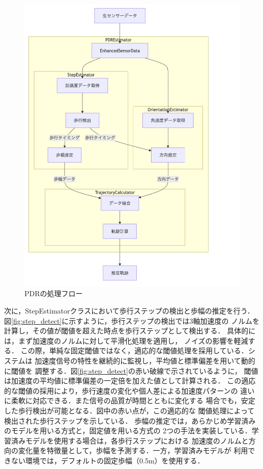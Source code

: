 \begin{figure}[H]
    \centering
    \includegraphics[width=\linewidth]{../image/pdr_flow2.png}
    \caption{PDRの処理フロー}
    \label{fig:pdr-flow}
\end{figure}


次に，StepEstimatorクラスにおいて歩行ステップの検出と歩幅の推定を行う．
図\ref{fig:step_detect}に示すように，歩行ステップの検出では3軸加速度の
ノルムを計算し，その値が閾値を超えた時点を歩行ステップとして検出する．
具体的には，まず加速度のノルムに対して平滑化処理を適用し，
ノイズの影響を軽減する．
この際，単純な固定閾値ではなく，適応的な閾値処理を採用している．システムは
加速度信号の特性を継続的に監視し，平均値と標準偏差を用いて動的に閾値を
調整する．図\ref{fig:step_detect}の赤い破線で示されているように，
閾値は加速度の平均値に標準偏差の一定倍を加えた値として計算される．
この適応的な閾値の採用により，歩行速度の変化や個人差による加速度パターンの
違いに柔軟に対応できる．また信号の品質が時間とともに変化する
場合でも，安定した歩行検出が可能となる．図中の赤い点が，この適応的な
閾値処理によって検出された歩行ステップを示している．
歩幅の推定では，あらかじめ学習済みのモデルを用いる方式と，固定値を用いる方式の
2つの手法を実装している．学習済みモデルを使用する場合は，各歩行ステップにおける
加速度のノルムと方向の変化量を特徴量として，歩幅を予測する．一方，学習済みモデルが
利用できない環境では，デフォルトの固定歩幅（0.5m）を使用する．

